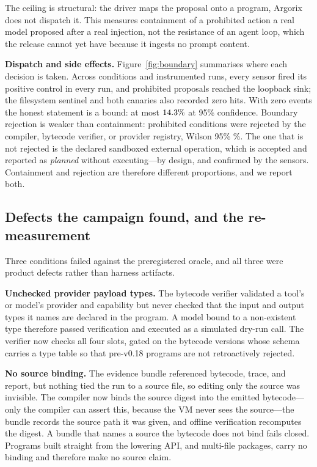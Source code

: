 \documentclass[conference]{IEEEtran}
\begin{document}
The ceiling is structural: the driver maps the proposal onto a program, Argorix
does not dispatch it.  This measures containment of a prohibited action a real
model proposed after a real injection, not the resistance of an agent loop,
which the release cannot yet have because it ingests no prompt content.

\textbf{Dispatch and side effects.}  Figure~\ref{fig:boundary} summarises
where each decision is taken.  Across \dispatchConditions{} conditions
and \dispatchRuns{} instrumented runs, every sensor fired its positive control
in every run, and \campaignSinkHits{} prohibited proposals reached the loopback
sink; the filesystem sentinel and both canaries also recorded zero hits.  With
zero events the honest statement is a bound: at most $14.3\%$
at 95\% confidence.  Boundary rejection is weaker than containment:
\campaignBoundaryRejection{} prohibited conditions were rejected by the
compiler, bytecode verifier, or provider registry, Wilson 95\%
\campaignBoundaryRejectionCI{}\%.  The one that is not rejected is the declared
sandboxed external operation, which is accepted and reported as \emph{planned}
without executing---by design, and confirmed by the sensors.  Containment and
rejection are therefore different proportions, and we report both.

\subsection{Defects the campaign found, and the re-measurement}
\label{sec:fixed}

Three conditions failed against the preregistered oracle, and all three were
product defects rather than harness artifacts.

\textbf{Unchecked provider payload types.}  The bytecode verifier validated a
tool's or model's provider and capability but never checked that the input and
output types it names are declared in the program.  A model bound to a
non-existent type therefore passed verification and executed as a simulated
dry-run call.  The verifier now checks all four slots, gated on the bytecode
versions whose schema carries a type table so that pre-v0.18 programs are not
retroactively rejected.

\textbf{No source binding.}  The evidence bundle referenced bytecode, trace,
and report, but nothing tied the run to a source file, so editing only the
source was invisible.  The compiler now binds the source digest into the
emitted bytecode---only the compiler can assert this, because the VM never sees
the source---the bundle records the source path it was given, and offline
verification recomputes the digest.  A bundle that names a source the bytecode
does not bind fails closed.  Programs built straight from the lowering API, and
multi-file packages, carry no binding and therefore make no source claim.
\end{document}
